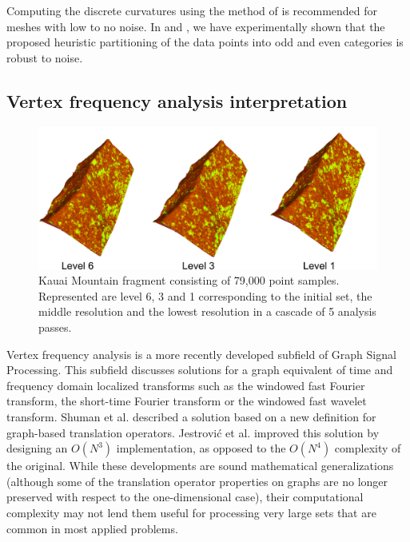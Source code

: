\documentclass[graybox]{svmult}
\begin{document}
	
	Computing the discrete curvatures using the method of \cite{Meyer2003} is recommended for meshes with low to no noise. In \cite{Cioaca2016} and \cite{Cioaca2016CEAI}, we have experimentally shown that the proposed heuristic partitioning of the data points into odd and even categories is robust to noise.
	
	\subsection{Vertex frequency analysis interpretation}
	\begin{figure}[!htbp]
		\centering
		\includegraphics[width=1\linewidth]{Kauai5.pdf}
		\caption{\label{fig_cds:Kauai}
			Kauai Mountain fragment consisting of 79,000 point samples. Represented are level 6, 3 and 1 corresponding to the initial set, the middle resolution and the lowest resolution in a cascade of 5 analysis passes. }
	\end{figure}
	
	Vertex frequency analysis is a more recently developed subfield of Graph Signal Processing. This subfield discusses solutions for a graph equivalent of time and frequency domain localized transforms such as the windowed fast Fourier transform, the short-time Fourier transform or the windowed fast wavelet transform. Shuman et al. \cite{Shuman2016} described a solution based on a new definition for graph-based translation operators. Jestrovi\'c et al.  \cite{Jestrovic2017} improved this solution by designing an $O(N^3)$ implementation, as opposed to the  $O(N^4)$ complexity of the original.  While these developments are sound mathematical generalizations (although some of the translation operator properties on graphs are no longer preserved with respect to the one-dimensional case), their computational complexity may not lend them useful for processing very large sets that are common in most applied problems.
	
\end{document}
